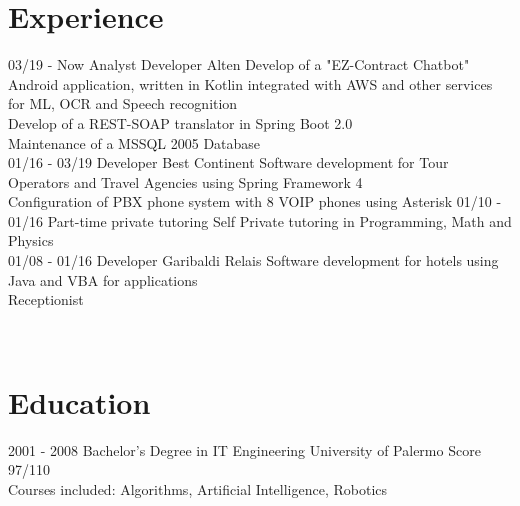 \documentclass[]{friggeri-cv}
\begin{document}
\section{Experience}
\begin{entrylist}
  \entry
    {03/19 - Now}
    {Analyst Developer}
    {Alten}
    {Develop of a "EZ-Contract Chatbot" Android application, written in Kotlin integrated with AWS and other services for ML, OCR and Speech recognition\\
    Develop of a REST-SOAP translator in Spring Boot 2.0\\
    Maintenance of a MSSQL 2005 Database\\}
  \entry
    {01/16 - 03/19}
    {Developer}
    {Best Continent}
    {Software development for Tour Operators and Travel Agencies using Spring Framework 4\\
    Configuration of PBX phone system with 8 VOIP phones using Asterisk}
  \entry
    {01/10 - 01/16}
    {Part-time private tutoring}
    {Self}
    {Private tutoring in Programming, Math and Physics\\}
  \entry
    {01/08 - 01/16}
    {Developer}
    {Garibaldi Relais}
    {Software development for hotels using Java and VBA for applications\\
    Receptionist}
\end{entrylist}
\\
\section{Education}
\begin{entrylist}
  \entry
    {2001 - 2008}
    {Bachelor's Degree in IT Engineering}
    {University of Palermo}
    {Score 97/110\\
    Courses included: Algorithms, Artificial Intelligence, Robotics}
\end{entrylist}
\end{document}
